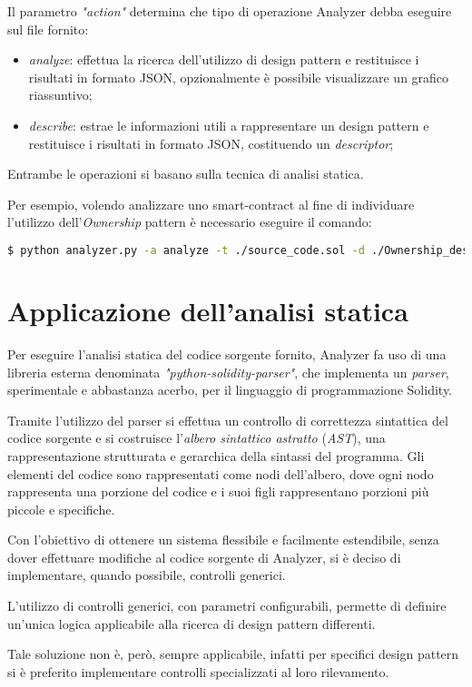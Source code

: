 \noindent Il parametro \textit{"action"} determina che tipo di operazione Analyzer debba eseguire sul file fornito:
\begin{itemize}
	\item \textit{analyze}: effettua la ricerca dell'utilizzo di design pattern e restituisce i risultati in formato JSON, opzionalmente è possibile visualizzare un grafico riassuntivo;
	\item \textit{describe}: estrae le informazioni utili a rappresentare un design pattern e restituisce i risultati in formato JSON, costituendo un \textit{descriptor};
\end{itemize}
Entrambe le operazioni si basano sulla tecnica di analisi statica.\par
Per esempio, volendo analizzare uno smart-contract al fine di individuare l'utilizzo dell'\textit{Ownership} pattern è necessario eseguire il comando:
\begin{lstlisting}[language=bash]
	$ python analyzer.py -a analyze -t ./source_code.sol -d ./Ownership_descriptor.json
\end{lstlisting}

\section{Applicazione dell'analisi statica}
Per eseguire l'analisi statica del codice sorgente fornito, Analyzer fa uso di una libreria esterna denominata \textit{"python-solidity-parser"}, che implementa un \textit{parser}, sperimentale e abbastanza acerbo, per il linguaggio di programmazione Solidity.\par
Tramite l'utilizzo del parser si effettua un controllo di correttezza sintattica del codice sorgente e si costruisce l'\textit{albero sintattico astratto} (\textit{AST}), una rappresentazione strutturata e gerarchica della sintassi del programma. Gli elementi del codice sono rappresentati come nodi dell'albero, dove ogni nodo rappresenta una porzione del codice e i suoi figli rappresentano porzioni più piccole e specifiche.
\newline

\noindent Con l'obiettivo di ottenere un sistema flessibile e facilmente estendibile, senza dover effettuare modifiche al codice sorgente di Analyzer, si è deciso di implementare, quando possibile, controlli generici.\par
L'utilizzo di controlli generici, con parametri configurabili, permette di definire un'unica logica applicabile alla ricerca di design pattern differenti.\par
Tale soluzione non è, però, sempre applicabile, infatti per specifici design pattern si è preferito implementare controlli specializzati al loro rilevamento.

